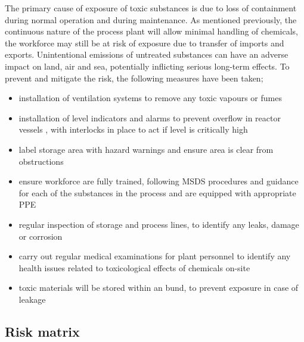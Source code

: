 The primary cause of exposure of toxic substances is due to loss of containment during normal operation and during maintenance. As mentioned previously, the continuous nature of the process plant will allow minimal handling of chemicals, the workforce may still be at risk of exposure due to transfer of imports and exports. Unintentional emissions of untreated substances can have an adverse impact on land, air and sea, potentially inflicting serious long-term effects. To prevent and mitigate the risk, the following measures have been taken;

\begin{itemize}
    \item installation of ventilation systems to remove any toxic vapours or fumes 
    \item installation of level indicators and alarms to prevent overflow in reactor vessels , with interlocks in place to act if level is critically high
    \item label storage area with hazard warnings and ensure area is clear from obstructions
    \item ensure workforce are fully trained, following MSDS procedures and guidance for each of the substances in the process and are equipped with appropriate PPE 
    \item regular inspection of storage and process lines, to identify any leaks, damage or corrosion 
    \item carry out regular medical examinations for plant personnel to identify any health issues related to toxicological effects of chemicals on-site
\item toxic materials will be stored within an bund, to prevent exposure in case of leakage
\end{itemize}



\subsection{Risk matrix}

